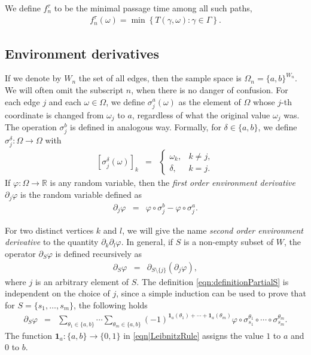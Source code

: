 \documentclass[reqno]{amsart}
\begin{document}
We define \( f_n^{\tau} \) to be the minimal passage time among all such paths,
\begin{eqnarray*}
f_n^{\tau}(\omega)
=
\min\left\{T(\gamma,\omega): \gamma \in \Gamma \right\}.
\end{eqnarray*}


\subsection{Environment derivatives}
If we denote by $W_n$ the set of all edges, then the sample space is $\Omega_n=\{a,b\}^{W_n}$. We will often omit the subscript $n$, when there is no danger of confusion. For each edge $j$ and each $\omega\in \Omega$, we define $\sigma_j^a(\omega)$ as the element of $\Omega$ whose $j$-th coordinate is changed from $\omega_j$ to $a$, regardless of what the original value $\omega_j$ was. The operation $\sigma_j^b$ is defined in analogous way. Formally, for $\delta\in\{a,b\}$, we define $\sigma_j^{\delta}:\Omega\to\Omega$ with 
\begin{eqnarray*}
\left[\sigma_j^{\delta}(\omega)\right]_k&=&\left\{\begin{array}{ll}\omega_k,& k\neq j,\\
\delta, &k=j.\end{array}\right.  
\end{eqnarray*}
If $\varphi:\Omega\to\mathbb R$ is any random variable, then the {\em first order environment derivative} $\partial_j\varphi$ is the random variable defined as 
\begin{eqnarray*}
\partial_j\varphi&=&\varphi\circ \sigma_j^b-\varphi\circ \sigma_j^a.  
\end{eqnarray*}

For two distinct vertices $k$ and $l$, we will give the name {\em second order environment derivative} to the quantity $\partial_{k}\partial_{l}\varphi$. In general, if $S$ is a non-empty subset of $W$, the operator $\partial_S\varphi$ is defined recursively as 
\begin{eqnarray}
\partial_S\varphi&=&\partial_{S\setminus\{j\}}\left(\partial_j\varphi\right), \label{eqn:definitionPartialS}
\end{eqnarray}
where $j$ is an arbitrary element of $S$. The definition \eqref{eqn:definitionPartialS} is independent on the choice of $j$, since a simple induction can be used to prove that for $S=\{s_1,\dots, s_m\}$, the following holds 
\begin{eqnarray}
\partial_S\varphi&=&\sum_{\theta_1\in\{a,b\}} \cdots\sum_{\theta_m\in\{a,b\}} (-1)^{\mathbf1_a(\theta_1)+ \cdots+\mathbf1_a(\theta_m)}\varphi\circ\sigma_{s_1}^{\theta_1} \circ\cdots\circ \sigma_{s_m}^{\theta_m}. \label{eqn|LeibnitzRule}
\end{eqnarray}
The function $\mathbf1_a:\{a,b\}\to \{0,1\}$ in \eqref{eqn|LeibnitzRule} assigns the value $1$ to $a$ and $0$ to $b$. 
\end{document}
